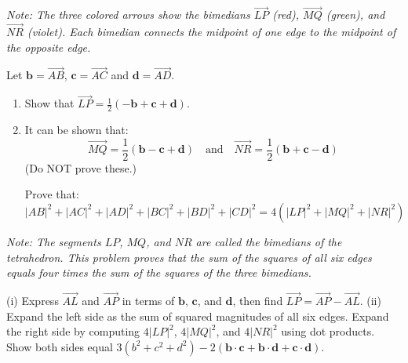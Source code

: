 \begin{problem}
\textit{Note: The three colored arrows show the bimedians $\overrightarrow{LP}$ (red), $\overrightarrow{MQ}$ (green), and $\overrightarrow{NR}$ (violet). Each bimedian connects the midpoint of one edge to the midpoint of the opposite edge.}

Let $\mathbf{b} = \overrightarrow{AB}$, $\mathbf{c} = \overrightarrow{AC}$ and $\mathbf{d} = \overrightarrow{AD}$.

\begin{enumerate}[label=(\roman*)]
    \item Show that $\overrightarrow{LP} = \frac{1}{2}(-\mathbf{b} + \mathbf{c} + \mathbf{d})$.
    
    \item It can be shown that:
    \[
    \overrightarrow{MQ} = \frac{1}{2}(\mathbf{b} - \mathbf{c} + \mathbf{d}) \quad \text{and} \quad \overrightarrow{NR} = \frac{1}{2}(\mathbf{b} + \mathbf{c} - \mathbf{d})
    \]
    (Do NOT prove these.)
    
    Prove that:
    \[
    |AB|^2 + |AC|^2 + |AD|^2 + |BC|^2 + |BD|^2 + |CD|^2 = 4\left( |LP|^2 + |MQ|^2 + |NR|^2 \right)
    \]
\end{enumerate}

\textit{Note: The segments $LP$, $MQ$, and $NR$ are called the bimedians of the tetrahedron. This problem proves that the sum of the squares of all six edges equals four times the sum of the squares of the three bimedians.}
\end{problem}

\begin{hint}
(i) Express $\overrightarrow{AL}$ and $\overrightarrow{AP}$ in terms of $\mathbf{b}$, $\mathbf{c}$, and $\mathbf{d}$, then find $\overrightarrow{LP} = \overrightarrow{AP} - \overrightarrow{AL}$.
(ii) Expand the left side as the sum of squared magnitudes of all six edges. Expand the right side by computing $4|LP|^2$, $4|MQ|^2$, and $4|NR|^2$ using dot products. Show both sides equal $3(b^2 + c^2 + d^2) - 2(\mathbf{b}\cdot\mathbf{c} + \mathbf{b}\cdot\mathbf{d} + \mathbf{c}\cdot\mathbf{d})$.
\end{hint}

